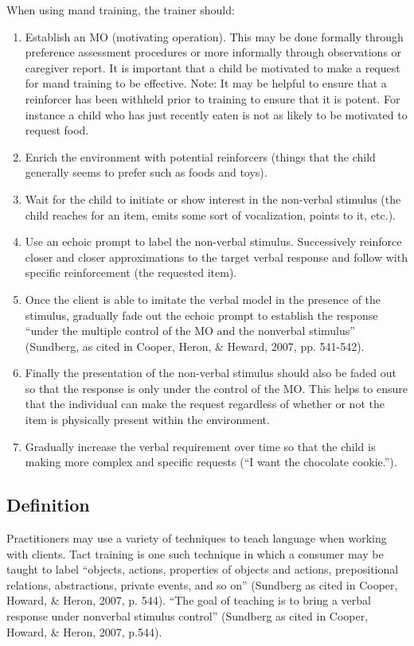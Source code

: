 When using mand training, the trainer should:
\begin{enumerate}
\item Establish an MO (motivating operation).  This may be done formally through preference assessment procedures or more informally through observations or caregiver report.  It is important that a child be motivated to make a request for mand training to be effective.  Note: It may be helpful to ensure that a reinforcer has been withheld prior to training to ensure that it is potent.  For instance a child who has just recently eaten is not as likely to be motivated to request food.  
\item Enrich the environment with potential reinforcers (things that the child generally seems to prefer such as foods and toys).
\item Wait for the child to initiate or show interest in the non-verbal stimulus (the child reaches for an item, emits some sort of vocalization, points to it, etc.). 
\item Use an echoic prompt to label the non-verbal stimulus.  Successively reinforce closer and closer approximations to the target verbal response and follow with specific reinforcement (the requested item).  
\item Once the client is able to imitate the verbal model in the presence of the stimulus, gradually fade out the echoic prompt to establish the response ``under the multiple control of the MO and the nonverbal stimulus'' (Sundberg, as cited in Cooper, Heron, \& Heward, 2007, pp. 541-542).  
\item Finally the presentation of the non-verbal stimulus should also be faded out so that the response is only under the control of the MO.  This helps to ensure that the individual can make the request regardless of whether or not the item is physically present within the environment. 
\item Gradually increase the verbal requirement over time so that the child is making more complex and specific requests (``I want the chocolate cookie.'').
\end{enumerate}
%
\subsection{Definition}
Practitioners may use a variety of techniques to teach language when working with clients.  Tact training is one such technique in which a consumer may be taught to label ``objects, actions, properties of objects and actions, prepositional relations, abstractions, private events, and so on''  (Sundberg as cited in Cooper, Howard, \& Heron, 2007, p. 544). ``The goal of teaching is to bring a verbal response under nonverbal stimulus control''  (Sundberg as cited in Cooper, Howard, \& Heron, 2007, p.544). 

